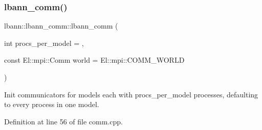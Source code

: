 \subsubsection{\texorpdfstring{lbann\+\_\+comm()}{lbann\_comm()}\hspace{0.1cm}{\footnotesize\ttfamily [1/2]}}
{\footnotesize\ttfamily lbann\+::lbann\+\_\+comm\+::lbann\+\_\+comm (\begin{DoxyParamCaption}\item[{int}]{procs\+\_\+per\+\_\+model = {},  }\item[{const El\+::mpi\+::\+Comm}]{world = {\ttfamily El\+:\+:mpi\+:\+:COMM\+\_\+WORLD} }\end{DoxyParamCaption})}

Init communicators for models each with procs\+\_\+per\+\_\+model processes, defaulting to every process in one model. 

Definition at line 56 of file comm.\+cpp.


